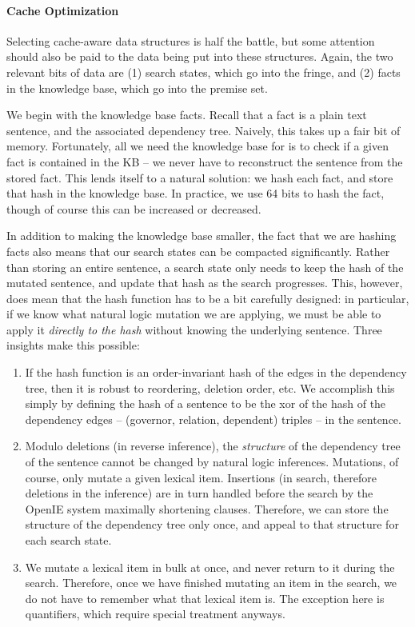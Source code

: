 \paragraph{Cache Optimization}
Selecting cache-aware data structures is half the battle, but some attention should also be
  paid to the data being put into these structures.
Again, the two relevant bits of data are (1) search states, which go into the fringe, and
  (2) facts in the knowledge base, which go into the premise set.

We begin with the knowledge base facts.
Recall that a fact is a plain text sentence, and the associated dependency tree.
Naively, this takes up a fair bit of memory.
Fortunately, all we need the knowledge base for is to check if a given fact is contained
  in the KB -- we never have to reconstruct the sentence from the stored fact.
This lends itself to a natural solution: we hash each fact, and store that hash in the
  knowledge base.
In practice, we use 64 bits to hash the fact, though of course this can be increased or
  decreased.

In addition to making the knowledge base smaller, the fact that we are hashing facts
  also means that our search states can be compacted significantly.
Rather than storing an entire sentence, a search state only needs to keep the hash of the
  mutated sentence, and update that hash as the search progresses.
This, however, does mean that the hash function has to be a bit carefully designed:
  in particular, if we know what natural logic mutation we are applying, we must be able to
  apply it \textit{directly to the hash} without knowing the underlying sentence.
Three insights make this possible:

\begin{enumerate}
  \item If the hash function is an order-invariant hash of the edges in the dependency tree,
        then it is robust to reordering, deletion order, etc.
        We accomplish this simply by defining the hash of a sentence to be the xor of the hash of
        the dependency edges -- (governor, relation, dependent) triples -- in the sentence.

  \item Modulo deletions (in reverse inference), the \textit{structure} of the dependency 
        tree of the sentence cannot be changed by natural logic inferences.
        Mutations, of course, only mutate a given lexical item. Insertions (in search, therefore deletions
        in the inference) are in turn handled before the search by the OpenIE system maximally shortening
        clauses.
        Therefore, we can store the structure of the dependency tree only once, and appeal to that structure for
        each search state.

  \item We mutate a lexical item in bulk at once, and never return to it during the search.
        Therefore, once we have finished mutating an item in the search, we do not have to remember what
        that lexical item is.
        The exception here is quantifiers, which require special treatment anyways.
\end{enumerate}

